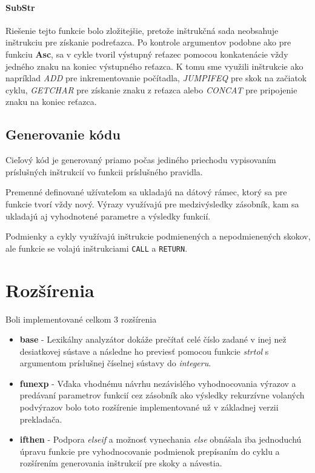 \documentclass{article}
\begin{document}
            \paragraph{SubStr}
            Riešenie tejto funkcie bolo zložitejšie, pretože inštrukčná sada neobsahuje inštrukciu pre získanie podreťazca. 
            Po kontrole argumentov podobne ako pre funkciu \textbf{Asc}, sa v cykle tvoril výstupný reťazec
            pomocou konkatenácie vždy jedného znaku na koniec výstupného reťazca. K tomu sme využili inštrukcie ako napríklad
            \emph{ADD} pre inkrementovanie počítadla, \emph{JUMPIFEQ} pre skok na začiatok cyklu, \emph{GETCHAR} 
            pre získanie znaku z reťazca alebo \emph{CONCAT} pre pripojenie znaku na koniec reťazca.
            
        \subsection{Generovanie kódu}
            Cieľový kód je generovaný priamo počas jediného priechodu vypisovaním príslušných inštrukcií vo funkcii
            príslušného pravidla.
            
            Premenné definované užívateľom sa ukladajú na dátový rámec, ktorý sa pre funkcie tvorí vždy nový.
            Výrazy využívajú pre medzivýsledky zásobník, kam sa ukladajú aj vyhodnotené parametre a výsledky funkcií.
            
            Podmienky a cykly využívajú inštrukcie podmienených a nepodmienených skokov, ale funkcie se volajú inštrukciami \texttt{CALL}
            a \texttt{RETURN}.
        
    \section{Rozšírenia}
    Boli implementované celkom 3 rozšírenia
        \begin{itemize}
            \item \textbf{base}   - Lexikálny analyzátor dokáže prečítať celé číslo zadané v inej než
                                    desiatkovej sústave a následne ho previesť pomocou funkcie 
                                    \emph{strtol} s argumentom príslušnej číselnej sústavy do \emph{integeru}.
            \item \textbf{funexp} - Vďaka vhodnému návrhu nezávislého vyhodnocovania výrazov a predávaní parametrov funkcií
                                    cez zásobník ako výsledky rekurzívne volaných podvýrazov bolo toto rozšírenie implementované
                                    už v základnej verzii prekladača.
            \item \textbf{ifthen} - Podpora \emph{elseif} a možnosť vynechania \emph{else} obnášala iba jednoduchú úpravu funkcie
                                    pre vyhodnocovanie podmienok prepísaním do cyklu a rozšírením generovania inštrukcií
                                    pre skoky a návestia.
        \end{itemize}
    
\end{document}
